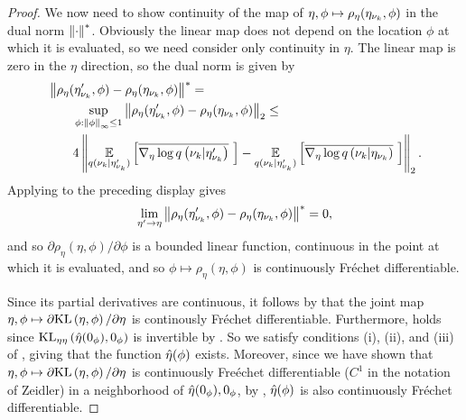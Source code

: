 \begin{thm}
\begin{proof}
We now need to show continuity of the map of $\eta, \phi \mapsto
\rho_\eta(\eta_{\nu_{k}}, \phi)$ in the dual norm $\left\Vert\cdot\right\Vert^*$.  Obviously the
linear map does not depend on the location $\phi$ at which it is evaluated, so
we need consider only continuity in $\eta$.  The linear map is zero in the
$\eta$ direction, so the dual norm is given by
%
\begin{align*}
%
\MoveEqLeft
\norm{\rho_\eta(\etanuk', \phi) - \rho_\eta(\etanuk, \phi)}^* ={}\\&
\sup_{\phi: \norminf{\phi} \le 1}
    \norm{\rho_\eta(\etanuk', \phi) - \rho_\eta(\etanuk, \phi)}_2 \le{}\\&
4 \norm{
    \expect{\q(\nuk \vert \etanuk')}{\lqgradbar{\nuk \vert \etanuk'}} -
    \expect{\q(\nuk \vert \etanuk')}{\lqgradbar{\nuk \vert \etanuk}}
}_2.
%
\end{align*}
%
Applying  to the preceding display gives
%
\begin{align*}
%
\lim_{\eta' \rightarrow \eta}
    \norm{\rho_\eta(\etanuk', \phi) - \rho_\eta(\etanuk, \phi)}^* = 0,
%
\end{align*}
%
and so $\partial \rho_\eta(\eta, \phi) / \partial \phi$ is a bounded linear
function, continuous in the point at which it is evaluated, and so $\phi \mapsto
\rho_\eta(\eta, \phi)$ is continuously Fr{\'e}chet differentiable.

Since its partial derivatives are continuous, it follows by \citet[Proposition
4.14(c)]{zeidler:2013:functional} that the joint map $\eta, \phi \mapsto
\partial \mathrm{KL}\left(\eta, \phi\right) / \partial \eta$ is continously Fr{\'e}chet
differentiable.  Furthermore, \citet[Chapter 4 Condition
21b]{zeidler:2013:functional} holds since $\mathrm{KL}_{\eta\eta}\left(\hat\eta(0_\phi), 0_\phi\right)$ is
invertible by .   So we satisfy conditions (i),
(ii), and (iii) of \citet[Theorem 4.B(c)]{zeidler:2013:functional}, giving that
the function $\hat\eta(\phi)$ exists.  Moreover, since we have shown that $\eta,
\phi \mapsto \partial \mathrm{KL}\left(\eta, \phi\right) / \partial \eta$ is continuously
Fre{\'e}chet differentiable ($C^1$ in the notation of Zeidler) in a neighborhood
of $\hat\eta(0_\phi), 0_\phi$, by \citet[Theorem 4.B(d)]{zeidler:2013:functional},
$\hat\eta(\phi)$ is also continuously Fr{\'e}chet differentiable.


\end{proof}
\end{thm}
